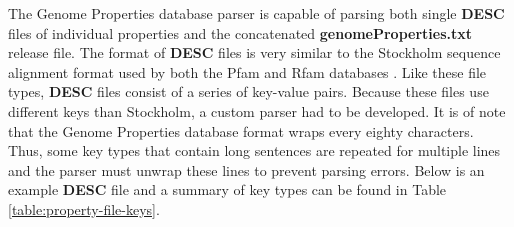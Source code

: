 The Genome Properties database parser is capable of parsing both single \textbf{DESC} files of individual properties and the concatenated \textbf{genomeProperties.txt} release file. The format of \textbf{DESC} files is very similar to the Stockholm sequence alignment format used by both the Pfam and Rfam databases \cite{bateman2004pfam, griffiths2003rfam}. Like these file types, \textbf{DESC} files consist of a series of key-value pairs. Because these files use different keys than Stockholm, a custom parser had to be developed. It is of note that the Genome Properties database format wraps every eighty characters. Thus, some key types that contain long sentences are repeated for multiple lines and the parser must unwrap these lines to prevent parsing errors. Below is an example \textbf{DESC} file and a summary of key types can be found in Table \ref{table:property-file-keys}.

